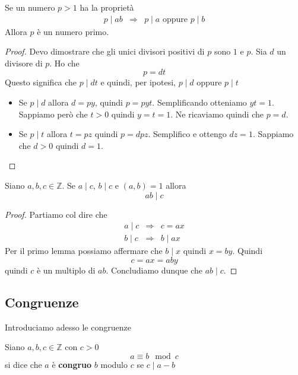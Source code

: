 \begin{lemma}
	Se un numero $p > 1$ ha la propriet\`a
	\begin{equation*}
		\begin{array}{lll}
			p \mid ab & \Rightarrow & p \mid a \text{ oppure } p \mid b
		\end{array}
	\end{equation*}
	Allora $p$ \`e un numero primo.
	\begin{proof}
		Devo dimostrare che gli unici divisori positivi di $p$ sono $1$ e $p$.
		Sia $d$ un divisore di $p$. Ho che
		\begin{equation*}
			p = dt
		\end{equation*}
		Questo significa che $p \mid dt$ e quindi, per ipotesi, $p \mid d$ oppure $p \mid t$
		\begin{itemize}
			\item Se $p \mid d$ allora $d = py$, quindi $p = pyt$. Semplificando otteniamo
			      $yt = 1$. Sappiamo per\`o che $t > 0$ quindi $y = t = 1$. Ne ricaviamo
			      quindi che $p = d$.
			\item Se $p \mid t$ allora $t = pz$ quindi $p = dpz$. Semplifico e ottengo
			      $dz = 1$. Sappiamo che $d > 0$ quindi $d = 1$.
		\end{itemize}
	\end{proof}
\end{lemma}

\begin{lemma}
	Siano $a, b, c \in \mathbb{Z}$. Se $a \mid c$, $b \mid c$ e $(a, b) = 1$ allora
	\begin{equation*}
		ab \mid c
	\end{equation*}
	\begin{proof}
		Partiamo col dire che
		\begin{equation*}
			\begin{array}{lll}
				a \mid c & \Rightarrow & c = ax    \\
				b \mid c & \Rightarrow & b \mid ax
			\end{array}
		\end{equation*}
		Per il primo lemma possiamo affermare che $b \mid x$ quindi $x = by$. Quindi
		\begin{equation*}
			c = ax = aby
		\end{equation*}
		quindi $c$ \`e un multiplo di $ab$. Concludiamo dunque che $ab \mid c$.
	\end{proof}
\end{lemma}

\subsection{Congruenze}
Introduciamo adesso le congruenze
\begin{defn}
	Siano $a, b, c \in \mathbb{Z}$ con $c > 0$
	\begin{equation*}
		a \equiv b \mod{c}
	\end{equation*}
	si dice che $a$ \`e \textbf{congruo} $b$ modulo $c$ se $c \mid a - b$
\end{defn}

